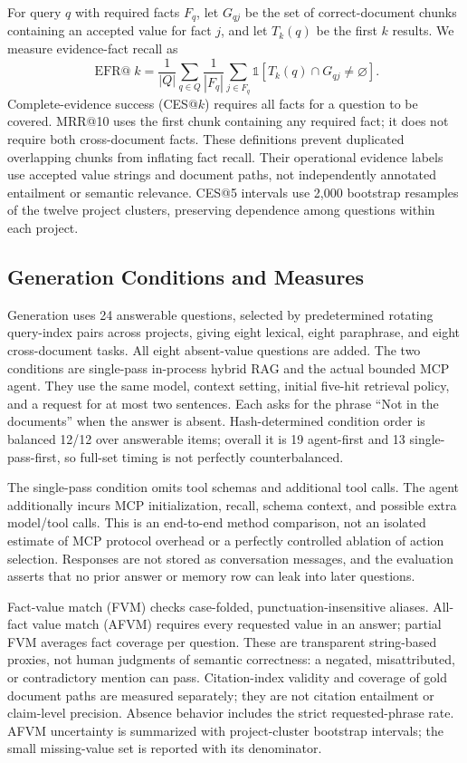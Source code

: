 \documentclass[conference,letterpaper]{IEEEtran}
\begin{document}
For query $q$ with required facts $F_q$, let $G_{qj}$ be the set of correct-document chunks containing an accepted value for fact $j$, and let $T_k(q)$ be the first $k$ results. We measure evidence-fact recall as
\begin{equation}
\operatorname{EFR@}k=\frac{1}{|Q|}\sum_{q\in Q}\frac{1}{|F_q|}
 \sum_{j\in F_q}\mathbb{1}[T_k(q)\cap G_{qj}\ne\varnothing].
\end{equation}
Complete-evidence success (CES@$k$) requires all facts for a question to be covered. MRR@10 uses the first chunk containing any required fact; it does not require both cross-document facts. These definitions prevent duplicated overlapping chunks from inflating fact recall. Their operational evidence labels use accepted value strings and document paths, not independently annotated entailment or semantic relevance. CES@5 intervals use 2,000 bootstrap resamples of the twelve project clusters, preserving dependence among questions within each project.

\subsection{Generation Conditions and Measures}
Generation uses 24 answerable questions, selected by predetermined rotating query-index pairs across projects, giving eight lexical, eight paraphrase, and eight cross-document tasks. All eight absent-value questions are added. The two conditions are single-pass in-process hybrid RAG and the actual bounded MCP agent. They use the same model, context setting, initial five-hit retrieval policy, and a request for at most two sentences. Each asks for the phrase ``Not in the documents'' when the answer is absent. Hash-determined condition order is balanced 12/12 over answerable items; overall it is 19 agent-first and 13 single-pass-first, so full-set timing is not perfectly counterbalanced.

The single-pass condition omits tool schemas and additional tool calls. The agent additionally incurs MCP initialization, recall, schema context, and possible extra model/tool calls. This is an end-to-end method comparison, not an isolated estimate of MCP protocol overhead or a perfectly controlled ablation of action selection. Responses are not stored as conversation messages, and the evaluation asserts that no prior answer or memory row can leak into later questions.

Fact-value match (FVM) checks case-folded, punctuation-insensitive aliases. All-fact value match (AFVM) requires every requested value in an answer; partial FVM averages fact coverage per question. These are transparent string-based proxies, not human judgments of semantic correctness: a negated, misattributed, or contradictory mention can pass. Citation-index validity and coverage of gold document paths are measured separately; they are not citation entailment or claim-level precision. Absence behavior includes the strict requested-phrase rate. AFVM uncertainty is summarized with project-cluster bootstrap intervals; the small missing-value set is reported with its denominator.
\end{document}
